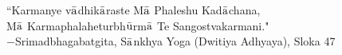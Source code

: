 \vspace*{\fill}
\vspace*{-2in}
\begin{myepigraph}
\large
``Karmanye v$\bar{\text a}$dhik$\bar{\text a}$raste M$\bar{\text a}$ Phaleshu Kad$\bar{\text a}$chana,\\ 
\large 
M$\bar{\text a}$ Karmaphalaheturbh$\bar{\text u}$rm$\bar{\text a}$ Te Sangostvakarmani."\\
\large $-$Srimadbhagabatgita,  S$\bar{\text a}$nkhya Yoga (Dwitiya Adhyaya), Sloka 47
\end{myepigraph}
\vspace*{\fill}